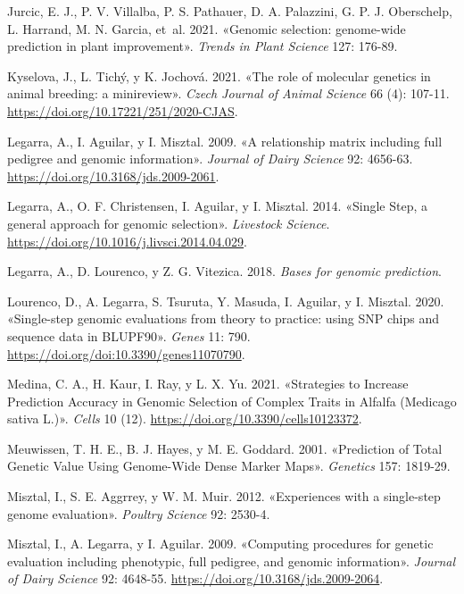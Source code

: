 \documentclass[11pt,spanish,a4paper,oneside,]{book} %
\begin{document}
\leavevmode\hypertarget{ref-cite:11}{}%
Jurcic, E. J., P. V. Villalba, P. S. Pathauer, D. A. Palazzini, G. P. J. Oberschelp, L. Harrand, M. N. Garcia, et~al. 2021. «Genomic selection: genome-wide prediction in plant improvement». \emph{Trends in Plant Science} 127: 176-89.

\leavevmode\hypertarget{ref-cite:32}{}%
Kyselova, J., L. Tichý, y K. Jochová. 2021. «The role of molecular genetics in animal breeding: a minireview». \emph{Czech Journal of Animal Science} 66 (4): 107-11. \url{https://doi.org/10.17221/251/2020-CJAS}.

\leavevmode\hypertarget{ref-cite:17}{}%
Legarra, A., I. Aguilar, y I. Misztal. 2009. «A relationship matrix including full pedigree and genomic information». \emph{Journal of Dairy Science} 92: 4656-63. \url{https://doi.org/10.3168/jds.2009-2061}.

\leavevmode\hypertarget{ref-cite:15}{}%
Legarra, A., O. F. Christensen, I. Aguilar, y I. Misztal. 2014. «Single Step, a general approach for genomic selection». \emph{Livestock Science}. \url{https://doi.org/10.1016/j.livsci.2014.04.029}.

\leavevmode\hypertarget{ref-cite:30}{}%
Legarra, A., D. Lourenco, y Z. G. Vitezica. 2018. \emph{Bases for genomic prediction}.

\leavevmode\hypertarget{ref-cite:22}{}%
Lourenco, D., A. Legarra, S. Tsuruta, Y. Masuda, I. Aguilar, y I. Misztal. 2020. «Single-step genomic evaluations from theory to practice: using SNP chips and sequence data in BLUPF90». \emph{Genes} 11: 790. \url{https://doi.org/doi:10.3390/genes11070790}.

\leavevmode\hypertarget{ref-cite:38}{}%
Medina, C. A., H. Kaur, I. Ray, y L. X. Yu. 2021. «Strategies to Increase Prediction Accuracy in Genomic Selection of Complex Traits in Alfalfa (Medicago sativa L.)». \emph{Cells} 10 (12). \url{https://doi.org/10.3390/cells10123372}.

\leavevmode\hypertarget{ref-cite:8}{}%
Meuwissen, T. H. E., B. J. Hayes, y M. E. Goddard. 2001. «Prediction of Total Genetic Value Using Genome-Wide Dense Marker Maps». \emph{Genetics} 157: 1819-29.

\leavevmode\hypertarget{ref-cite:14}{}%
Misztal, I., S. E. Aggrrey, y W. M. Muir. 2012. «Experiences with a single-step genome evaluation». \emph{Poultry Science} 92: 2530-4.

\leavevmode\hypertarget{ref-cite:16}{}%
Misztal, I., A. Legarra, y I. Aguilar. 2009. «Computing procedures for genetic evaluation including phenotypic, full pedigree, and genomic information». \emph{Journal of Dairy Science} 92: 4648-55. \url{https://doi.org/10.3168/jds.2009-2064}.
\end{document}
